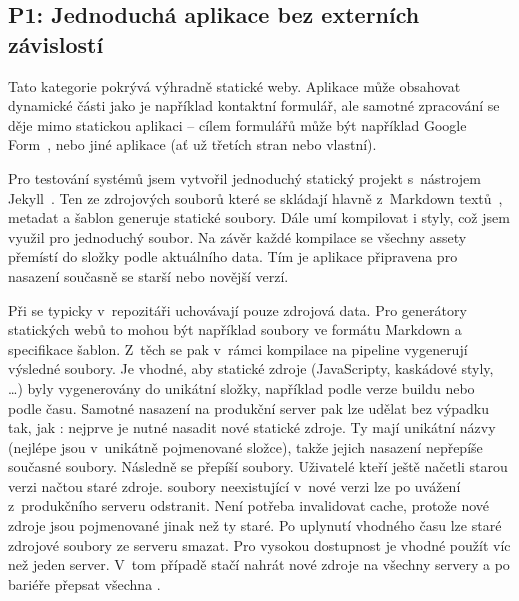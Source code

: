     \subsection{P1: Jednoduchá aplikace bez externích závislostí}
        Tato kategorie pokrývá výhradně statické weby. Aplikace může obsahovat dynamické části jako je například kontaktní formulář, ale samotné zpracování se děje mimo statickou aplikaci -- cílem formulářů může být například Google Form~\cite{mccoy-google-form}, nebo jiné aplikace (ať už třetích stran nebo vlastní).

        Pro testování \CICD systémů jsem vytvořil jednoduchý statický projekt s~nástrojem Jekyll~\cite{jekyll}. Ten ze zdrojových souborů které se skládají hlavně z~Markdown textů~\cite{markdown}, metadat a šablon generuje statické \HTML soubory. Dále umí kompilovat i styly, což jsem využil pro jednoduchý  soubor. Na závěr každé kompilace se všechny assety přemístí do složky podle aktuálního data. Tím je aplikace připravena pro nasazení současně se starší nebo novější verzí.

        Při \CICD se typicky v~repozitáři uchovávají pouze zdrojová data. Pro generátory statických webů to mohou být například soubory ve formátu Markdown a specifikace \HTML šablon. Z~těch se pak v~rámci kompilace na \CICD pipeline vygenerují výsledné \HTML soubory. Je vhodné, aby statické zdroje (JavaScripty, kaskádové styly, \ldots) byly vygenerovány do unikátní složky, například podle verze buildu nebo podle času. Samotné nasazení na produkční server pak lze udělat bez výpadku tak, jak : nejprve je nutné nasadit nové statické zdroje. Ty mají unikátní názvy (nejlépe jsou v~unikátně pojmenované složce), takže jejich nasazení nepřepíše současné soubory. Následně se přepíší \HTML soubory. Uživatelé kteří ještě načetli starou verzi načtou staré zdroje. \HTML soubory neexistující v~nové verzi lze po uvážení z~produkčního serveru odstranit. Není potřeba invalidovat cache, protože nové zdroje jsou pojmenované jinak než ty staré. Po uplynutí vhodného času lze staré zdrojové soubory ze serveru smazat. Pro vysokou dostupnost je vhodné použít víc než jeden server. V~tom případě stačí nahrát nové zdroje na všechny servery a po bariéře přepsat všechna \HTML.

